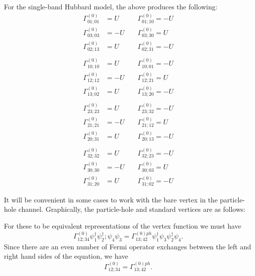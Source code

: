 For the single-band Hubbard model, the above produces
the following:
\begin{eqnarray}
\Gamma^{(0)}_{01;01} & = U  \;\;\;\; & \Gamma^{(0)}_{01;10} = -U \\
\Gamma^{(0)}_{03;03} & = -U \;\;\;\; & \Gamma^{(0)}_{03;30} = U \\
\Gamma^{(0)}_{02;13} & = U \;\;\;\; & \Gamma^{(0)}_{02;31} = -U \\
\\
\Gamma^{(0)}_{10;10} & = U \;\;\;\; & \Gamma^{(0)}_{10;01} = -U \\
\Gamma^{(0)}_{12;12} & = -U \;\;\;\; & \Gamma^{(0)}_{12;21} = U \\
\Gamma^{(0)}_{13;02} & = U \;\;\;\; & \Gamma^{(0)}_{13;20} = -U \\
\\
\Gamma^{(0)}_{23;23} & = U \;\;\;\; & \Gamma^{(0)}_{23;32} = -U \\
\Gamma^{(0)}_{21;21} & = -U \;\;\;\; & \Gamma^{(0)}_{21;12} = U \\
\Gamma^{(0)}_{20;31} & = U \;\;\;\; & \Gamma^{(0)}_{20;13} = -U \\
\\
\Gamma^{(0)}_{32;32} & = U \;\;\;\; & \Gamma^{(0)}_{32;23} = -U \\
\Gamma^{(0)}_{30;30} & = -U  \;\;\;\; & \Gamma^{(0)}_{30;03} = U \\
\Gamma^{(0)}_{31;20} & = U \;\;\;\; & \Gamma^{(0)}_{31;02} = -U 
\end{eqnarray}

It will be convenient in some cases to work with the bare vertex in 
the particle-hole channel.
Graphically, the particle-hole and standard
vertices are as follows:
\begin{center}
\end{center}
For these to be equivalent representations of the vertex function
we must have
\begin{equation}
\Gamma^{(0)}_{1 2; 3 4}\psi_1^{\dagger}\psi_2^{\dagger};
\psi_4 \psi_3  = 
\Gamma^{(0)ph}_{1 3; 4 2} \psi_1^{\dagger}\psi_3
\psi_2^{\dagger}\psi_4.
\end{equation}
Since there are an even number of Fermi operator exchanges between
the left and right hand sides of the equation, we have
\begin{equation}
\Gamma^{(0)}_{1 2; 3 4} = \Gamma^{(0)ph}_{1 3; 4 2}.
\end{equation}

